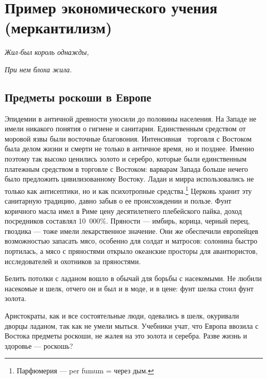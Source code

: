 %
%
\section[Пример экономического учения (меркантилизм)]{Пример экономического учения (меркантилизм)}
{\raggedleft\itshape
Жил-был король однажды,
\par}
{\raggedleft\itshape
При нем блоха жила.
\par}

\subsection[Предметы роскоши в Европе]{Предметы роскоши в Европе}
Эпидемии в античной древности уносили до половины населения. На Западе не имели никакого понятия о гигиене и санитарии.
Единственным средством от моровой язвы были восточные благовония. Интенсивная \ торговля с Востоком была делом жизни и
смерти не только в античное время, но и позднее. Именно поэтому так высоко ценились золото и серебро, которые были
единственным платежным средством в торговле с Востоком: варварам Запада больше нечего было предложить цивилизованному
Востоку. Ладан и мирра использовались не только как антисептики, но и как психотропные
средства.\footnote{Парфюмерия — \foreignlanguage{english}{per fumum} =
через дым.} Церковь хранит эту санитарную традицию, давно забыв о ее происхождении и пользе. Фунт
коричного масла имел в Риме цену десятилетнего плебейского пайка, доход посредников составлял 10~000\%. Пряности —
имбирь, корица, черный перец, гвоздика — тоже имели лекарственное значение. Они же обеспечили европейцев возможностью
запасать мясо, особенно для солдат и матросов: солонина быстро портилась, а мясо с пряностями открыло океанские
просторы для авантюристов, исследователей и охотников за пряностями.

Белить потолки с ладаном вошло в обычай для борьбы с насекомыми. Не любили насекомые и шелк, отчего он и был и в моде, и
в цене: фунт шелка стоил фунт золота.

Аристократы, как и все состоятельные люди, одевались в шелк, окуривали дворцы ладаном, так как не умели мыться. Учебники
учат, что Европа ввозила с Востока предметы роскоши, не жалея на это золота и серебра. Разве жизнь и здоровье —
роскошь?

